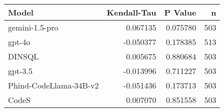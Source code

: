 \begin{tabular}{lrrr}
\toprule
Model & Kendall-Tau & P Value & n \\
\midrule
gemini-1.5-pro & 0.067135 & 0.075780 & 503 \\
gpt-4o & -0.050377 & 0.178385 & 513 \\
DINSQL & 0.005675 & 0.880684 & 503 \\
gpt-3.5 & -0.013996 & 0.711227 & 503 \\
Phind-CodeLlama-34B-v2 & -0.051436 & 0.173713 & 503 \\
CodeS & 0.007070 & 0.851558 & 503 \\
\bottomrule
\end{tabular}
